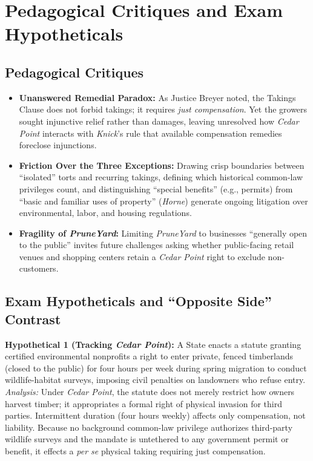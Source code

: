 \documentclass[12pt]{article}
\begin{document}
\begin{itemize}
\end{itemize}

\section{Pedagogical Critiques and Exam Hypotheticals}

\subsection{Pedagogical Critiques}
\begin{itemize}
    \item \textbf{Unanswered Remedial Paradox:} As Justice Breyer noted, the Takings Clause does not forbid takings; it requires \emph{just compensation}. Yet the growers sought injunctive relief rather than damages, leaving unresolved how \textit{Cedar Point} interacts with \textit{Knick}'s rule that available compensation remedies foreclose injunctions.
    \item \textbf{Friction Over the Three Exceptions:} Drawing crisp boundaries between ``isolated'' torts and recurring takings, defining which historical common-law privileges count, and distinguishing ``special benefits'' (e.g., permits) from ``basic and familiar uses of property'' (\textit{Horne}) generate ongoing litigation over environmental, labor, and housing regulations.
    \item \textbf{Fragility of \textit{PruneYard}:} Limiting \textit{PruneYard} to businesses ``generally open to the public'' invites future challenges asking whether public-facing retail venues and shopping centers retain a \textit{Cedar Point} right to exclude non-customers.
\end{itemize}

\subsection{Exam Hypotheticals and ``Opposite Side'' Contrast}
\textbf{Hypothetical 1 (Tracking \textit{Cedar Point}):} A State enacts a statute granting certified environmental nonprofits a right to enter private, fenced timberlands (closed to the public) for four hours per week during spring migration to conduct wildlife-habitat surveys, imposing civil penalties on landowners who refuse entry. \emph{Analysis:} Under \textit{Cedar Point}, the statute does not merely restrict how owners harvest timber; it appropriates a formal right of physical invasion for third parties. Intermittent duration (four hours weekly) affects only compensation, not liability. Because no background common-law privilege authorizes third-party wildlife surveys and the mandate is untethered to any government permit or benefit, it effects a \emph{per se} physical taking requiring just compensation.
\end{document}
